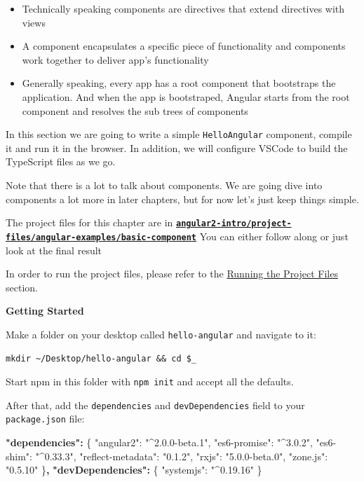 \documentclass[12pt,]{article}
\newenvironment{Shaded}{}{}
\newcommand{\DataTypeTok}[1]{{#1}}
\newcommand{\StringTok}[1]{\textcolor[rgb]{0.00,0.50,0.50}{{#1}}}
\newcommand{\FunctionTok}[1]{{#1}}
\newcommand{\ErrorTok}[1]{\textcolor[rgb]{1.00,0.00,0.00}{\textbf{{#1}}}}
\providecommand{\tightlist}{%
  \setlength{\itemsep}{0pt}\setlength{\parskip}{0pt}}
\begin{document}
\begin{itemize}
\tightlist
\item
  Technically speaking components are directives that extend directives
  with views
\item
  A component encapsulates a specific piece of functionality and
  components work together to deliver app's functionality
\item
  Generally speaking, every app has a root component that bootstraps the
  application. And when the app is bootstraped, Angular starts from the
  root component and resolves the sub trees of components
\end{itemize}

In this section we are going to write a simple \texttt{HelloAngular}
component, compile it and run it in the browser. In addition, we will
configure VSCode to build the TypeScript files as we go.

Note that there is a lot to talk about components. We are going dive
into components a lot more in later chapters, but for now let's just
keep things simple.

The project files for this chapter are in
\textbf{\href{https://github.com/aminmeyghani/angular2-intro/tree/master/project-files/angular-examples/basic-component}{\texttt{angular2-intro/project-files/angular-examples/basic-component}}}
You can either follow along or just look at the final result

In order to run the project files, please refer to the
\protect\hyperlink{running-the-project-files}{Running the Project Files}
section.

\textbf{Getting Started}

Make a folder on your desktop called \texttt{hello-angular} and navigate
to it:

\begin{verbatim}
mkdir ~/Desktop/hello-angular && cd $_
\end{verbatim}

Start npm in this folder with \texttt{npm\ init} and accept all the
defaults.

After that, add the \texttt{dependencies} and \texttt{devDependencies}
field to your \texttt{package.json} file:

\begin{Shaded}
\begin{Highlighting}[numbers=left,,]
\ErrorTok{"dependencies":} \FunctionTok{\{}
  \DataTypeTok{"angular2"}\FunctionTok{:} \StringTok{"^2.0.0-beta.1"}\FunctionTok{,}
  \DataTypeTok{"es6-promise"}\FunctionTok{:} \StringTok{"^3.0.2"}\FunctionTok{,}
  \DataTypeTok{"es6-shim"}\FunctionTok{:} \StringTok{"^0.33.3"}\FunctionTok{,}
  \DataTypeTok{"reflect-metadata"}\FunctionTok{:} \StringTok{"0.1.2"}\FunctionTok{,}
  \DataTypeTok{"rxjs"}\FunctionTok{:} \StringTok{"5.0.0-beta.0"}\FunctionTok{,}
  \DataTypeTok{"zone.js"}\FunctionTok{:} \StringTok{"0.5.10"}
\FunctionTok{\}}\ErrorTok{,}
\ErrorTok{"devDependencies":} \FunctionTok{\{}
  \DataTypeTok{"systemjs"}\FunctionTok{:} \StringTok{"^0.19.16"}
\FunctionTok{\}}
\end{Highlighting}
\end{Shaded}
\end{document}
